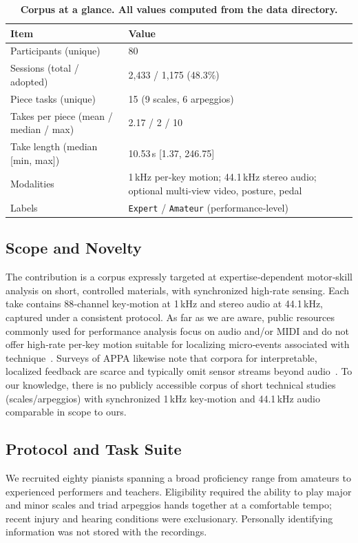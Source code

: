 \documentclass[sigconf,review,anonymous]{acmart}
\begin{document}
\begin{table}[t]
  \centering
  \caption{\textbf{Corpus at a glance. All values computed from the data directory.}}
  \label{tab:profy_glance}
  \begin{tabular}{@{}ll@{}}
    \toprule
    Item & Value \\
    \midrule
    Participants (unique) & 80 \\
    Sessions (total / adopted) & 2{,}433 / 1{,}175 (48.3\%) \\
    Piece tasks (unique) & 15 (9 scales, 6 arpeggios) \\
    Takes per piece (mean / median / max) & 2.17 / 2 / 10 \\
    Take length (median [min, max]) & 10.53\,s [1.37, 246.75] \\
    Modalities & 1\,kHz per‑key motion; 44.1\,kHz stereo audio; optional multi‑view video, posture, pedal \\
    Labels & \texttt{Expert} / \texttt{Amateur} (performance‑level) \\
    \bottomrule
  \end{tabular}
\end{table}

\subsection{Scope and Novelty}
\label{subsec:scope}
The contribution is a corpus expressly targeted at expertise‑dependent motor‑skill analysis on short, controlled materials, with synchronized high‑rate sensing. Each take contains 88‑channel key‑motion at 1\,kHz and stereo audio at 44.1\,kHz, captured under a consistent protocol. As far as we are aware, public resources commonly used for performance analysis focus on audio and/or MIDI and do not offer high‑rate per‑key motion suitable for localizing micro‑events associated with technique~\cite{Hawthorne2019MAESTRO,Emiya2010MAPS,Foscarin2020ASAP}. Surveys of APPA likewise note that corpora for interpretable, localized feedback are scarce and typically omit sensor streams beyond audio~\cite{Kim2022APPA}. To our knowledge, there is no publicly accessible corpus of short technical studies (scales/arpeggios) with synchronized 1\,kHz key‑motion and 44.1\,kHz audio comparable in scope to ours.

\subsection{Protocol and Task Suite}
\label{subsec:protocol}
We recruited eighty pianists spanning a broad proficiency range from amateurs to experienced performers and teachers. Eligibility required the ability to play major and minor scales and triad arpeggios hands together at a comfortable tempo; recent injury and hearing conditions were exclusionary. Personally identifying information was not stored with the recordings.
\end{document}
